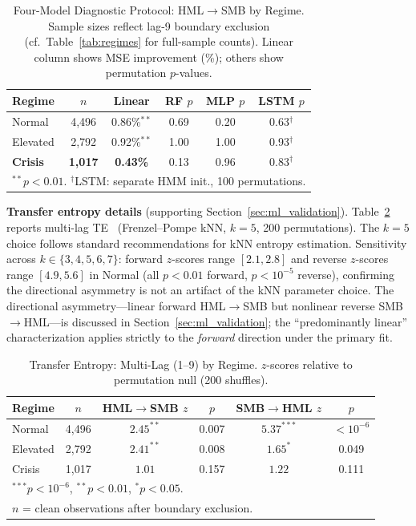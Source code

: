 \documentclass[sigconf,anonymous]{acmart}
\begin{document}
\begin{table}[t]
\centering
\caption[Four-model diagnostics]{Four-Model Diagnostic Protocol: HML$\to$SMB by Regime.
Sample sizes reflect lag-9 boundary exclusion (cf.\ Table~\ref{tab:regimes} for full-sample counts).
Linear column shows MSE improvement (\%); others show permutation $p$-values.}
\label{tab:neural}
\small
\begin{tabular}{lccccc}
\toprule
Regime & $n$ & Linear & RF $p$ & MLP $p$ & LSTM $p$ \\
\midrule
Normal & 4,496 & 0.86\%$^{**}$ & 0.69 & 0.20 & 0.63$^\dagger$ \\
Elevated & 2,792 & 0.92\%$^{**}$ & 1.00 & 1.00 & 0.93$^\dagger$ \\
\textbf{Crisis} & \textbf{1,017} & \textbf{0.43\%} & 0.13 & 0.96 & 0.83$^\dagger$ \\
\bottomrule
\multicolumn{6}{l}{\footnotesize $^{**}p < 0.01$. $^\dagger$LSTM: separate HMM init., 100 permutations.} \\
\end{tabular}
\end{table}

\textbf{Transfer entropy details} (supporting Section~\ref{sec:ml_validation}).
Table~\ref{tab:te} reports multi-lag TE~\cite{schreiber2000measuring,barnett2009granger}
(Frenzel--Pompe kNN, $k=5$, 200 permutations).
The $k=5$ choice follows standard recommendations for kNN entropy estimation.
Sensitivity across $k \in \{3,4,5,6,7\}$: forward $z$-scores range $[2.1, 2.8]$
and reverse $z$-scores range $[4.9, 5.6]$ in Normal (all $p < 0.01$ forward,
$p < 10^{-5}$ reverse), confirming the directional asymmetry is not an
artifact of the kNN parameter choice.
The directional asymmetry---linear forward HML$\to$SMB but nonlinear
reverse SMB$\to$HML---is discussed in Section~\ref{sec:ml_validation};
the ``predominantly linear'' characterization applies strictly to the
\emph{forward} direction under the primary fit.

\begin{table}[t]
\centering
\caption{Transfer Entropy: Multi-Lag (1--9) by Regime.
$z$-scores relative to permutation null (200 shuffles).}
\label{tab:te}
\scriptsize
\begin{tabular}{@{}lccccc@{}}
\toprule
Regime & $n$ & HML$\to$SMB $z$ & $p$ & SMB$\to$HML $z$ & $p$ \\
\midrule
Normal & 4,496 & $2.45^{**}$ & 0.007 & $5.37^{***}$ & $< 10^{-6}$ \\
Elevated & 2,792 & $2.41^{**}$ & 0.008 & $1.65^{*}$ & 0.049 \\
Crisis & 1,017 & $1.01$ & 0.157 & $1.22$ & 0.111 \\
\bottomrule
\multicolumn{6}{l}{\footnotesize $^{***}p < 10^{-6}$, $^{**}p < 0.01$, $^{*}p < 0.05$.} \\
\multicolumn{6}{l}{\footnotesize $n$ = clean observations after boundary exclusion.} \\
\end{tabular}
\end{table}
\end{document}
